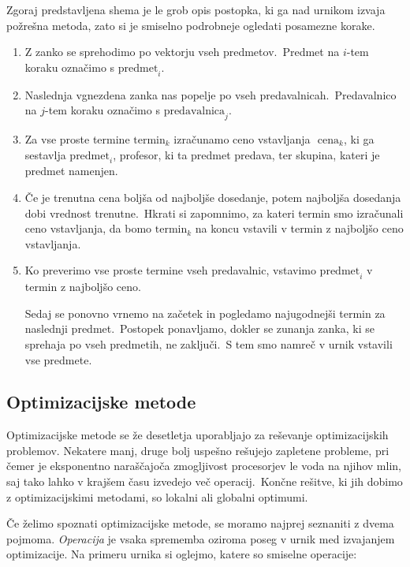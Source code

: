 \documentclass[a4paper,10pt]{article}
\begin{document}
\noindent Zgoraj predstavljena shema je le grob opis postopka, ki ga nad urnikom izvaja požrešna metoda,
zato si je smiselno podrobneje ogledati posamezne korake.
\begin{enumerate} 
   \item Z zanko se sprehodimo po vektorju vseh predmetov.\ Predmet na \(i\)-tem koraku
   označimo s \(\textrm{predmet}_i\).

   \item Naslednja vgnezdena zanka nas popelje po vseh predavalnicah.\ Predavalnico na
   \(j\)-tem koraku označimo s \(\textrm{predavalnica}_j\).

   \item Za vse proste termine \(\textrm{termin}_k\) izračunamo ceno vstavljanja
   \(\textrm{ cena}_k\), ki ga sestavlja \(\textrm{predmet}_i\), profesor, ki ta predmet predava,
   ter skupina, kateri je predmet namenjen.

   \item Če je trenutna cena boljša od najboljše dosedanje, potem najboljša dosedanja
   dobi vrednost trenutne.\ Hkrati si zapomnimo, za kateri termin smo izračunali ceno
   vstavljanja, da bomo \(\textrm{termin}_k\) na koncu vstavili v termin z najboljšo
   ceno vstavljanja.

   \item Ko preverimo vse proste termine vseh predavalnic, vstavimo \(\textrm{predmet}_i\)
   v termin z najboljšo ceno.

   Sedaj se ponovno vrnemo na začetek in pogledamo najugodnejši termin za naslednji
   predmet.\ Postopek ponavljamo, dokler se zunanja zanka, ki se sprehaja po vseh predmetih,
   ne zaključi.\ S tem smo namreč v urnik vstavili vse predmete.
\end{enumerate}
\subsection{Optimizacijske metode}

Optimizacijske metode se že desetletja uporabljajo za reševanje optimizacijskih problemov.
Nekatere manj, druge bolj uspešno rešujejo zapletene probleme, pri čemer je eksponentno
naraščajoča zmogljivost procesorjev le voda na njihov mlin, saj tako lahko v krajšem
času izvedejo več operacij.\ Končne rešitve, ki jih dobimo z optimizacijskimi metodami,
so lokalni ali globalni optimumi.

Če želimo spoznati optimizacijske metode, se moramo najprej seznaniti z dvema pojmoma.
\emph{Operacija} je vsaka sprememba oziroma poseg v urnik med izvajanjem optimizacije.
Na primeru urnika si oglejmo, katere so smiselne operacije:
\end{document}
